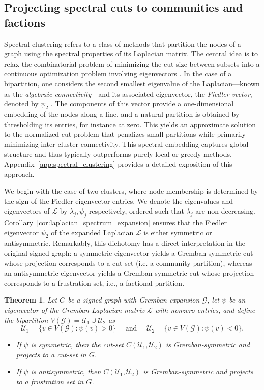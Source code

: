 \documentclass[reprint,onecolumn]{article}
\newtheorem{theorem}{Theorem}[section]
\newcommand{\mc}[1]{\mathcal{#1}}
\newcommand{\1}{\mathbb{1}}
\newcommand{\0}{\mathbf{0}}
\begin{document}
\subsection{Projecting spectral cuts to communities and factions}
Spectral clustering refers to a class of methods that partition the nodes of a graph using the spectral properties of its Laplacian matrix. The central idea is to relax the combinatorial problem of minimizing the cut size between subsets into a continuous optimization problem involving eigenvectors \cite{vonLuxburg2007}. In the case of a bipartition, one considers the second smallest eigenvalue of the Laplacian---known as the \emph{algebraic connectivity}---and its associated eigenvector, the \emph{Fiedler vector}, denoted by $\psi_2$ \cite{fiedler1973algebraic}. The components of this vector provide a one-dimensional embedding of the nodes along a line, and a natural partition is obtained by thresholding its entries, for instance at zero. This yields an approximate solution to the normalized cut problem that penalizes small partitions while primarily minimizing inter-cluster connectivity. This spectral embedding captures global structure and thus typically outperforms purely local or greedy methods. Appendix~\ref{app:spectral_clustering} provides a detailed exposition of this approach.

We begin with the case of two clusters, where node membership is determined by the sign of the Fiedler eigenvector entries. We denote the eigenvalues and eigenvectors of $\mc L$ by $\lambda_j, \psi_j$ respectively, ordered such that $\lambda_j$ are non-decreasing. Corollary~\ref{cor:laplacian_spectrum_expansion} ensures that the Fiedler eigenvector $\psi_2$ of the expanded Laplacian 
$\mc L$ is either symmetric or antisymmetric. Remarkably, this dichotomy has a direct interpretation in the original signed graph: a symmetric eigenvector yields a Gremban-symmetric cut whose projection corresponds to a cut-set (i.e. a community partition), whereas an antisymmetric eigenvector yields a Gremban-symmetric cut whose projection corresponds to a frustration set, i.e., a factional partition.


\begin{theorem}
\label{thm:fiedler_cut_projection}
Let $G$ be a signed graph with Gremban expansion $\mathcal{G}$, let $\psi$ be an eigenvector of the Gremban Laplacian matrix $\mathcal{L}$ with nonzero entries, and define the bipartition $V(\mathcal{G})=\mathcal{U}_1\cup\mathcal{U}_2$ as
$$
\mathcal{U}_1=\{v\in V(\mathcal{G}):\psi(v)>0\}\quad\text{~and~}\quad\mathcal{U}_2=\{v\in V(\mathcal{G}):\psi(v)<0\}.
$$
\begin{itemize}
    \item If $\psi$ is symmetric, then the cut-set $C(\mathcal{U}_1,\mathcal{U}_2)$ is Gremban-symmetric and projects to a cut-set in $G$. 
    \item If $\psi$ is antisymmetric, then $C(\mathcal{U}_1,\mathcal{U}_2)$ is Gremban-symmetric and projects to a frustration set in $G$.
\end{itemize}
\end{theorem}
\end{document}

